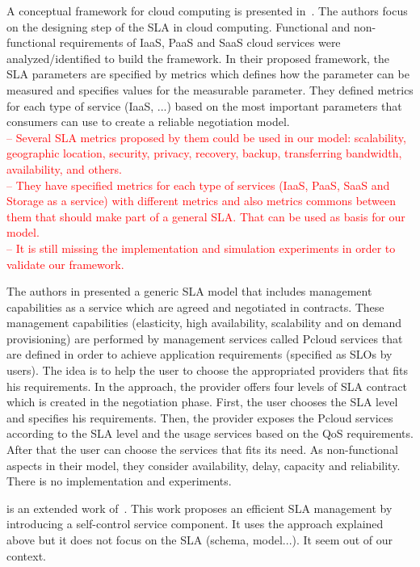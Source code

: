 \documentclass[12pt,a4paper,oneside]{article}
\begin{document}
A conceptual framework for cloud computing is presented in~\cite{005}. The authors focus on the designing step of the SLA in cloud computing. Functional and non-functional requirements of IaaS, PaaS and SaaS cloud services were analyzed/identified to build the framework. In their proposed framework, the SLA parameters are specified by metrics which defines how the parameter can be measured and specifies values for the measurable parameter. They defined metrics for each type of service (IaaS, ...) based on the most important parameters that consumers can use to create a reliable negotiation model. \\ 
\textcolor{red}{-- Several SLA metrics proposed by them could be used in our model: scalability, geographic location, security, privacy, recovery, backup, transferring bandwidth, availability, and others. \\
-- They have specified metrics for each type of services (IaaS, PaaS, SaaS and Storage as a service) with different metrics and also metrics commons between them that should make part of a general SLA. That can be used as basis for our model.\\
-- It is still missing the implementation and simulation experiments in order to validate our framework.}


\bigskip
The authors in \cite{009} presented a generic SLA model that includes management capabilities as a service which are agreed and negotiated in contracts. These management capabilities (elasticity, high availability, scalability and on demand provisioning) are performed by management services called Pcloud services that are defined in order to achieve application requirements (specified as SLOs by users). The idea is to help the user to choose the appropriated providers that fits his requirements. In the approach, the provider offers four levels of SLA contract which is created in the negotiation phase. First, the user chooses the SLA level and specifies his requirements. Then, the provider exposes the Pcloud services according to the SLA level and the usage services based on the QoS requirements. After that the user can choose the services that fits its need. As non-functional aspects in their model, they consider availability, delay, capacity and reliability. There is no implementation and experiments.

\bigskip
\cite{008} is an extended work of~\cite{009}. This work proposes an efficient SLA management by introducing a self-control service component. It uses the approach explained above but it does not focus on the SLA (schema, model...). It seem out of our context.
\end{document}
